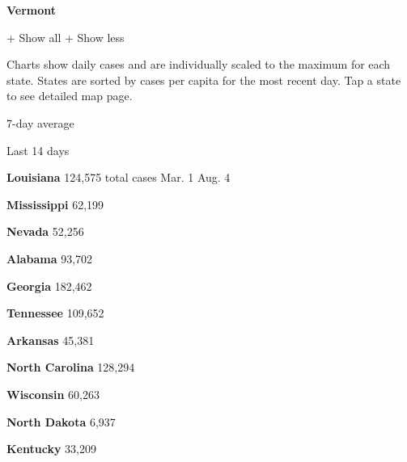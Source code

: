 \textbf{Vermont}

+ Show all + Show less

Charts show daily cases and are individually scaled to the maximum for
each state. States are sorted by cases per capita for the most recent
day. Tap a state to see detailed map page.

\href{https://www.nytimes.com/interactive/2020/us/louisiana-coronavirus-cases.html}{}

7-day average

Last 14 days

\textbf{Louisiana} 124,575 total cases Mar. 1 Aug. 4

\href{https://www.nytimes.com/interactive/2020/us/mississippi-coronavirus-cases.html}{}

\textbf{Mississippi} 62,199

\href{https://www.nytimes.com/interactive/2020/us/nevada-coronavirus-cases.html}{}

\textbf{Nevada} 52,256

\href{https://www.nytimes.com/interactive/2020/us/alabama-coronavirus-cases.html}{}

\textbf{Alabama} 93,702

\href{https://www.nytimes.com/interactive/2020/us/georgia-coronavirus-cases.html}{}

\textbf{Georgia} 182,462

\href{https://www.nytimes.com/interactive/2020/us/tennessee-coronavirus-cases.html}{}

\textbf{Tennessee} 109,652

\href{https://www.nytimes.com/interactive/2020/us/arkansas-coronavirus-cases.html}{}

\textbf{Arkansas} 45,381

\href{https://www.nytimes.com/interactive/2020/us/north-carolina-coronavirus-cases.html}{}

\textbf{North Carolina} 128,294

\href{https://www.nytimes.com/interactive/2020/us/wisconsin-coronavirus-cases.html}{}

\textbf{Wisconsin} 60,263

\href{https://www.nytimes.com/interactive/2020/us/north-dakota-coronavirus-cases.html}{}

\textbf{North Dakota} 6,937

\href{https://www.nytimes.com/interactive/2020/us/kentucky-coronavirus-cases.html}{}

\textbf{Kentucky} 33,209

